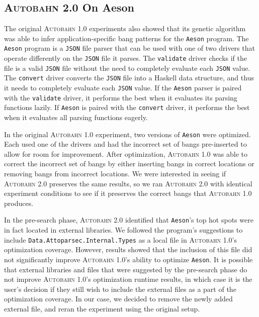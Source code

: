 \documentclass[format=sigplan, review=true]{acmart}
\newcommand{\Ao}[0]{\textsc{Autobahn 1.0}}
\newcommand{\At}[0]{\textsc{Autobahn 2.0}}
\newcommand{\preopt}[0]{pre-search}
\begin{document}
\subsection{\At{} On Aeson}
 

 The original \Ao{} experiments also showed that its genetic algorithm was able to infer application-specific bang patterns for the \texttt{Aeson} program. The \texttt{Aeson} program is a \texttt{JSON} file parser that can be used with one of two drivers that operate differently on the \texttt{JSON} file it parses. The \texttt{validate} driver checks if the file is a valid \texttt{JSON} file without the need to completely evaluate each \texttt{JSON} value. The \texttt{convert} driver converts the \texttt{JSON} file into a Haskell data structure, and thus it needs to completely evaluate each \texttt{JSON} value. If the \texttt{Aeson} parser is paired with the \texttt{validate} driver, it performs the best when it evaluates its parsing functions lazily. If \texttt{Aeson} is paired with the \texttt{convert} driver, it performs the best when it evaluates all parsing functions eagerly. 
 
In the original \Ao{} experiment, two versions of \texttt{Aeson} were optimized. Each used one of the drivers and had the incorrect set of bangs pre-inserted to allow for room for improvement. After optimization, \Ao{} was able to correct the incorrect set of bangs by either inserting bangs in correct locations or removing bangs from incorrect locations. We were interested in seeing if \At{} preserves the same results, so we ran \At{} with identical experiment conditions to see if it preserves the correct bangs that \Ao{} produces. 

In the \preopt{} phase, \At{} identified that \texttt{Aeson}'s top hot spots were in fact located in external libraries. We followed the program's suggestions to include \texttt{Data.Attoparsec.Internal.Types} as a local file in \Ao{}'s optimization coverage. However, results showed that the inclusion of this file did not significantly improve \Ao{}'s ability to optimize \texttt{Aeson}. It is possible that external libraries and files that were suggested by the \preopt{} phase do not improve \Ao{}'s optimization runtime results, in which case it is the user's decision if they still wish to include the external files as a part of the optimization coverage. In our case, we decided to remove the newly added external file, and reran the experiment using the original setup. 
\end{document}
